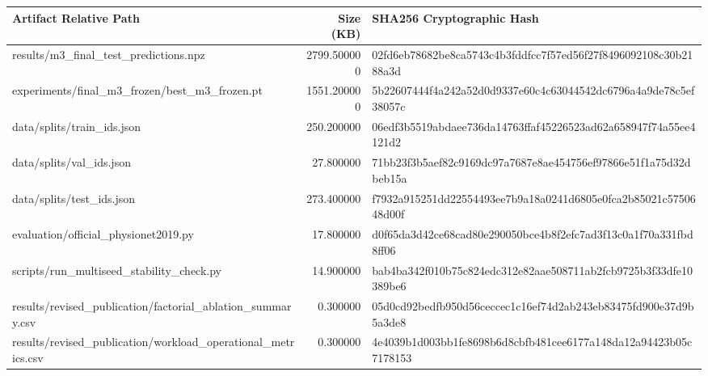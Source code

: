 \begin{tabular}{lrl}
\toprule
Artifact Relative Path & Size (KB) & SHA256 Cryptographic Hash \\
\midrule
results/m3\_final\_test\_predictions.npz & 2799.500000 & 02fd6eb78682be8ca5743c4b3fddfcc7f57ed56f27f8496092108c30b2188a3d \\
experiments/final\_m3\_frozen/best\_m3\_frozen.pt & 1551.200000 & 5b22607444f4a242a52d0d9337e60c4c63044542dc6796a4a9de78c5ef38057c \\
data/splits/train\_ids.json & 250.200000 & 06edf3b5519abdaee736da14763ffaf45226523ad62a658947f74a55ee4121d2 \\
data/splits/val\_ids.json & 27.800000 & 71bb23f3b5aef82c9169dc97a7687e8ae454756ef97866e51f1a75d32dbeb15a \\
data/splits/test\_ids.json & 273.400000 & f7932a915251dd22554493ee7b9a18a0241d6805e0fca2b85021c5750648d00f \\
evaluation/official\_physionet2019.py & 17.800000 & d0f65da3d42ce68cad80e290050bce4b8f2efc7ad3f13c0a1f70a331fbd8ff06 \\
scripts/run\_multiseed\_stability\_check.py & 14.900000 & bab4ba342f010b75c824edc312e82aae508711ab2fcb9725b3f33dfe10389be6 \\
results/revised\_publication/factorial\_ablation\_summary.csv & 0.300000 & 05d0cd92bedfb950d56ceccec1c16ef74d2ab243eb83475fd900e37d9b5a3de8 \\
results/revised\_publication/workload\_operational\_metrics.csv & 0.300000 & 4e4039b1d003bb1fe8698b6d8cbfb481cee6177a148da12a94423b05c7178153 \\
\bottomrule
\end{tabular}
